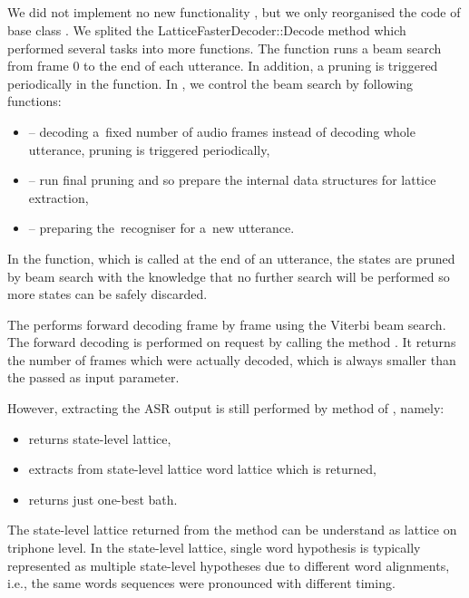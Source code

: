 \subsection{}
\label{sub:dec}
We did not implement no new functionality , but we only reorganised the code of base class .
We splited the LatticeFasterDecoder::Decode method which performed several tasks into more functions.
The  function runs a beam search from frame 0 to the end of each utterance.
In addition, a pruning is triggered periodically in the function.
In ,  we control the beam search by following functions: 
\begin{itemize}
\item {} -- decoding a~fixed number of audio frames instead of decoding whole utterance, pruning is triggered periodically,
\item {} -- run final pruning and so prepare the internal data structures for lattice extraction,
\item {} -- preparing the~recogniser for a~new utterance.
\end{itemize}

In the  function, which is called at the end of an utterance, the states are pruned by beam search with the knowledge that no further search will be performed so more states can be safely discarded.

The  performs forward decoding frame by frame using the Viterbi beam search.
The forward decoding is performed on request by calling the method .
It returns the number of frames which were actually decoded, which is always smaller than the  passed as input parameter.

However, extracting the \ac{ASR} output is still performed by method of , namely:
\begin{itemize}
    \item {} returns state-level lattice,
    \item {} extracts from state-level lattice word lattice which is returned,
    \item {} returns just one-best bath.
\end{itemize}

The state-level lattice returned from the  method can be understand as lattice on triphone level.
In the state-level lattice, single word hypothesis is typically represented as multiple state-level hypotheses due to different word alignments, i.e., the same words sequences were pronounced with different timing.


